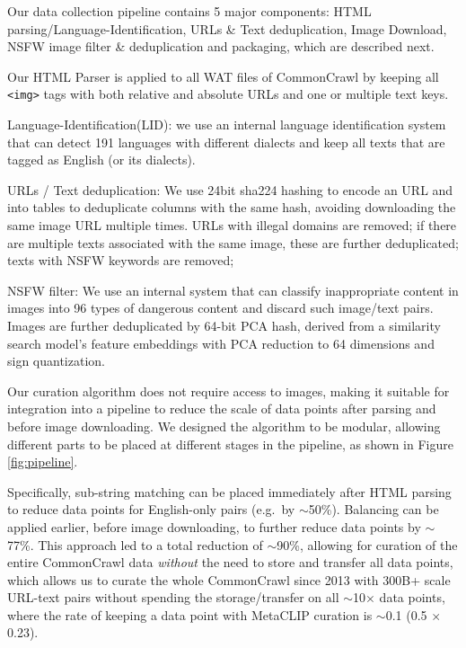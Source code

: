 \documentclass{article} %
\begin{document}
{\color{black}
Our data collection pipeline contains 5 major components: HTML parsing/Language-Identification, URLs \& Text deduplication, Image Download, NSFW image filter \& deduplication and packaging, which are described next. 

Our HTML Parser is applied to all WAT files of CommonCrawl by keeping all \texttt{<img>} tags with both relative and absolute URLs and one or multiple text keys. 

Language-Identification(LID): we use an internal language identification system that can detect 191 languages with different dialects and keep all texts that are tagged as English (or its dialects). 

URLs / Text deduplication: We use 24bit sha224 hashing to encode an URL and into tables to deduplicate columns with the same hash, avoiding downloading the same image URL multiple times. URLs with illegal domains are removed; if there are multiple texts associated with the same image, these are further deduplicated; texts with NSFW keywords are removed; 

NSFW filter: We use an internal system that can classify inappropriate content in images into 96 types of dangerous content and discard such image/text pairs. Images are further deduplicated by 64-bit PCA hash, derived from a similarity search model's feature embeddings with PCA reduction to 64 dimensions and sign quantization.
}

Our curation algorithm does not require access to images, making it suitable for integration into a pipeline to reduce the scale of data points after parsing and before image downloading. We designed the algorithm to be modular, allowing different parts to be placed at different stages in the pipeline, as shown in Figure \ref{fig:pipeline}. 

Specifically, sub-string matching can be placed immediately after HTML parsing to reduce data points for English-only pairs (e.g.~by $\sim$50\%). Balancing can be applied earlier, before image downloading, to further reduce data points by  $\sim$77\%. This approach led to a total reduction of  $\sim$90\%, allowing for curation of the entire CommonCrawl data \textit{without} the need to store and transfer all data points, which allows us to curate the whole CommonCrawl since 2013 with 300B+ scale URL-text pairs without spending the storage/transfer on all $\sim$10$\times$ data points, where the rate of keeping a data point with MetaCLIP curation is $\sim$0.1 (0.5 $\times$ 0.23).
\end{document}
